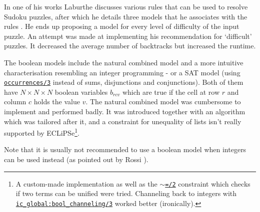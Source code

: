 In one of his works Laburthe discusses various rules that can be used to resolve Sudoku puzzles, after which he details three models that he associates with the rules \cite{article:laburthe}. He ends up proposing a model for every level of difficulty of the input puzzle. An attempt was made at implementing his recommendation for `difficult' puzzles. It decreased the average number of backtracks but increased the runtime. \\\par

The boolean models include the natural combined model \cite{article:natural} and a more intuitive characterisation resembling an integer programming - or a SAT model \cite{article:sat} (using \href{http://eclipseclp.org/doc/bips/lib/ic_global/occurrences-3.html}{\texttt{occurrences/3}} instead of sums, disjunctions and conjunctions). Both of them have $N\times N\times N$ boolean variables $b_{rcv}$ which are true if the cell at row $r$ and column $c$ holds the value $v$. The natural combined model was cumbersome to implement and performed badly. It was introduced together with an algorithm which was tailored after it, and a constraint for unequality of lists isn't really supported by ECLiPSe\footnote{A custom-made implementation as well as the \href{https://eclipseclp.org/doc/bips/kernel/termcomp/TE-2.html}{\texttt{$\sim$=/2}} constraint which checks if two terms can be unified were tried. Channeling back to integers with \href{http://eclipseclp.org/doc/bips/lib/ic_global/bool_channeling-3.html}{\texttt{ic\_global:bool\_channeling/3}} worked better (ironically).}.\par
Note that it is usually not recommended to use a boolean model when integers can be used instead (as pointed out by Rossi \cite{book:rossi}).\\\par

